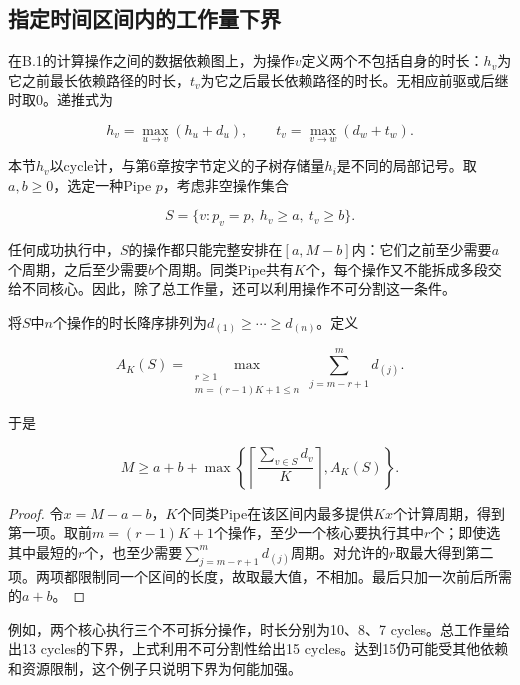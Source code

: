 \documentclass[anonymous,notoc]{gmcm2026}
\begin{document}
\subsection{指定时间区间内的工作量下界}

在B.1的计算操作之间的数据依赖图上，为操作\(v\)定义两个不包括自身的时长：\(h_v\)为它之前最长依赖路径的时长，\(t_v\)为它之后最长依赖路径的时长。无相应前驱或后继时取0。递推式为

\begin{equation}
h_v=\max_{u\to v}(h_u+d_u),\qquad t_v=\max_{v\to w}(d_w+t_w).
\end{equation}

本节\(h_v\)以cycle计，与第6章按字节定义的子树存储量\(h_i\)是不同的局部记号。取\(a,b\ge0\)，选定一种Pipe \(p\)，考虑非空操作集合

\begin{equation}
S=\{v:p_v=p,\ h_v\ge a,\ t_v\ge b\}.
\end{equation}

任何成功执行中，\(S\)的操作都只能完整安排在\([a,M-b]\)内：它们之前至少需要\(a\)个周期，之后至少需要\(b\)个周期。同类Pipe共有\(K\)个，每个操作又不能拆成多段交给不同核心。因此，除了总工作量，还可以利用操作不可分割这一条件。

将\(S\)中\(n\)个操作的时长降序排列为\(d_{(1)}\ge\cdots\ge d_{(n)}\)。定义

\begin{equation}
A_K(S)=\max_{\substack{r\ge1\\m=(r-1)K+1\le n}}\sum_{j=m-r+1}^{m}d_{(j)}.
\end{equation}

于是

\begin{equation}
M\ge a+b+\max\left\{\left\lceil\frac{\sum_{v\in S}d_v}{K}\right\rceil,A_K(S)\right\}.
\end{equation}

\begin{proof} 令\(x=M-a-b\)，\(K\)个同类Pipe在该区间内最多提供\(Kx\)个计算周期，得到第一项。取前\(m=(r-1)K+1\)个操作，至少一个核心要执行其中\(r\)个；即使选其中最短的\(r\)个，也至少需要\(\sum_{j=m-r+1}^{m}d_{(j)}\)周期。对允许的\(r\)取最大得到第二项。两项都限制同一个区间的长度，故取最大值，不相加。最后只加一次前后所需的\(a+b\)。\end{proof}

例如，两个核心执行三个不可拆分操作，时长分别为10、8、7 cycles。总工作量给出13 cycles的下界，上式利用不可分割性给出15 cycles。达到15仍可能受其他依赖和资源限制，这个例子只说明下界为何能加强。
\end{document}
